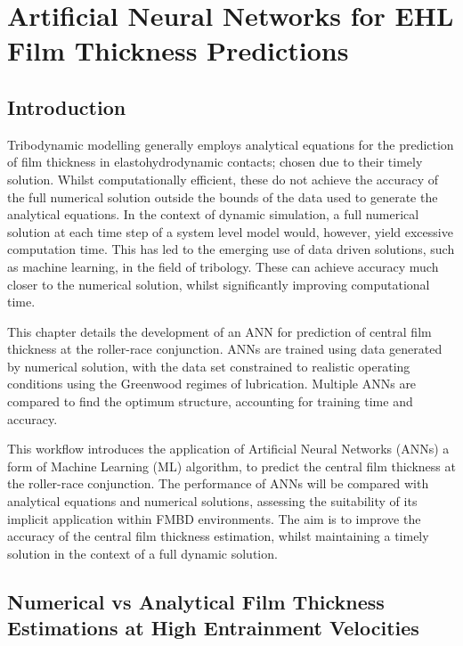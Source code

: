 \chapter{Artificial Neural Networks for EHL Film Thickness Predictions}
\label{ANN Lubricated Bearing FMBD}

\section{Introduction}

Tribodynamic modelling generally employs analytical equations for the prediction of film thickness in elastohydrodynamic contacts; chosen due to their timely solution. Whilst computationally efficient, these do not achieve the accuracy of the full numerical solution outside the bounds of the data used to generate the analytical equations. In the context of dynamic simulation, a full numerical solution at each time step of a system level model would, however, yield excessive computation time. This has led to the emerging use of data driven solutions, such as machine learning, in the field of tribology. These can achieve accuracy much closer to the numerical solution, whilst significantly improving computational time.

This chapter details the development of an ANN for prediction of central film thickness at the roller-race conjunction. ANNs are trained using data generated by numerical solution, with the data set constrained to realistic operating conditions using the Greenwood regimes of lubrication. Multiple ANNs are compared to find the optimum structure, accounting for training time and accuracy.

This workflow introduces the application of Artificial Neural Networks (ANNs) a form of Machine Learning (ML) algorithm, to predict the central film thickness at the roller-race conjunction. The performance of ANNs will be compared with analytical equations and numerical solutions, assessing the suitability of its implicit application within FMBD environments. The aim is to improve the accuracy of the central film thickness estimation, whilst maintaining a timely solution in the context of a full dynamic solution.

\section{Numerical vs Analytical Film Thickness Estimations at High Entrainment Velocities}

